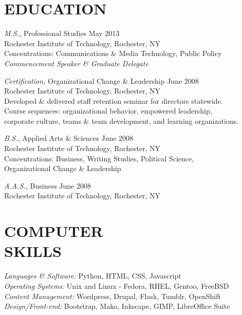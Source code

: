 \documentclass[margin]{res}
\begin{document}
\begin{resume}
\section{EDUCATION}
    \textsl{M.S.,} Professional Studies \hfill May 2013\\
    Rochester Institute of Technology, Rochester, NY\\
    Concentrations: Communications \& Media Technology, Public Policy\\
    \textsl{Commencement Speaker \& Graduate Delegate}

    \textsl{Certification,} Organizational Change \& Leadership \hfill June 2008\\
    Rochester Institute of Technology, Rochester, NY\\
    Developed \& delivered staff retention seminar for directors statewide.\\
    Course sequences: organizational behavior, empowered leadership, \\
    corporate culture, teams \& team development, and learning organizations.

    \textsl{B.S.,} Applied Arts \& Sciences \hfill June 2008\\
    Rochester Institute of Technology, Rochester, NY\\
    Concentrations: Business, Writing Studies, Political Science,\\
                    Organizational Change \& Leadership

    \textsl{A.A.S.,} Business \hfill June 2008\\
    Rochester Institute of Technology, Rochester, NY

\section{COMPUTER \\ SKILLS}
    {\sl Languages \& Software:} Python, HTML, CSS, Javascript\\
    {\sl Operating Systems:} Unix and Linux - Fedora, RHEL, Gentoo, FreeBSD\\
    {\sl Content Management:} Wordpress, Drupal, Flask, Tumblr, OpenShift\\
    {\sl Design/Front-end:} Bootstrap, Mako, Inkscape, GIMP, LibreOffice Suite\\
\end{resume}
\end{document}
